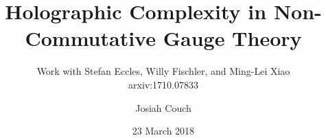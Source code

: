 \documentclass[8pt,aspectratio=169]{beamer}
\title{Holographic Complexity in Non-Commutative Gauge Theory}
\subtitle{Work with Stefan Eccles, Willy Fischler, and Ming-Lei Xiao\\ arxiv:1710.07833}
\author{Josiah Couch}
\institute{University of Texas at Austin}
\date{23 March 2018}
\begin{document}
\begin{frame}
\titlepage\end{frame}





\end{document}
